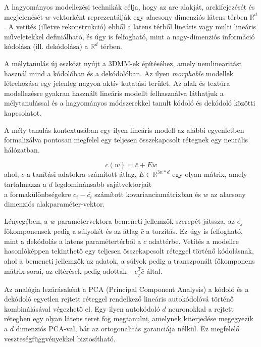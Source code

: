 \documentclass[12pt,a4]{article}
\begin{document}
	A hagyományos modellezési technikák célja, hogy
	az arc alakját, arckifejezését és megjelenését $w$ vektorként reprezentálják egy
	alacsony dimenziós látens térben $\mathbb{R}^d$ . A vetítés (illetve rekonstrukció) ebből a latens térből lineáris vagy multi lineáris műveletekkel definiálható, és úgy is felfogható, mint a nagy-dimenziós információ kódolása (ill.
	dekódolása) a $\mathbb{R}^d$ térben.
	
	
	A mélytanulás új eszközt nyújt a 3DMM-ek építéséhez, amely nemlinearitást használ mind a kódolóban és a dekódolóban. Az ilyen \textit{morphable} modellek létrehozása egy jelenleg nagyon aktív kutatási terület.
	Az alak és textúra modellezésre gyakran használt lineáris modellt felhasználva láthatjuk a mélytanulással és a hagyományos módszerekkel tanult kódoló és dekódoló közötti kapcsolatot.
	
	
	A mély tanulás kontextusában egy ilyen lineáris modell
	az alábbi egyenletben formalizálva pontosan megfelel egy teljesen összekapcsolt rétegnek egy
	neurális hálózatban.
	
	\begin{mdframed}
	\begin{equation}
		c(w) = \bar{c} + Ew 
	\end{equation}
		  ahol, $\bar{c}$ a tanítási adatokra számított átlag, $E \in \mathbb{R}^{3n*d}$ egy olyan mátrix, amely tartalmazza a $d$ legdominánsabb sajátvektorjait \\
		  a formakülönbségekre $c_i - \bar{c_i}$ számított kovarianciamátrixban és
		$w$ az alacsony dimenziós alakparaméter-vektor.
	\end{mdframed}
	
	Lényegében, a $w$ paramétervektora bemeneti jellemzők szerepét játssza, az $e_j$ főkomponensek pedig a súlyokét és az átlag $\bar{c}$ a torzítás.
	Ez úgy is felfogható, mint a dekódolás a latens paramétertérből a $c$ adattérbe. Vetítés a modellre
	hasonlóképpen tekinthető egy teljesen összekapcsolt réteggel történő kódolásnak,
	ahol a bemeneti jellemzők az adatok, a súlyok pedig a transzponált főkomponens mátrix sorai, az eltérések pedig adottak $-e^{T}_{j}\bar{c}$ által.
	
	
	 Az analógia lezárásaként a PCA (Principal Component Analysis) a kódoló és a dekódoló egyetlen rejtett réteggel rendelkező lineáris autokódolóvá történő kombinálásával végezhető el.
	Egy ilyen autokódoló $d$ neuronokkal a
	rejtett rétegben egy olyan látens teret fog megtanulni, amelynek kiterjedése megegyezik a $d$
	dimenziós PCA-val, bár az ortogonalitás garanciája nélkül.
	Ez megfelelő veszteségfüggvényekkel biztosítható.
	
\end{document}
